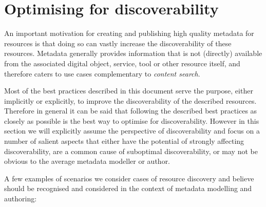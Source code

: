 \section{Optimising for
discoverability}\label{optimising-for-discoverability}


An important motivation for creating and publishing high quality metadata for resources is that doing so can vastly increase the discoverability of these resources. Metadata generally provides information that is not (directly) available from the associated digital object, service, tool or other resource itself, and therefore caters to use cases complementary to \emph{content search}.

Most of the best practices described in this document serve the purpose, either implicitly or explicitly, to improve the discoverability of the described resources. Therefore in general it can be said that following the described best practices as closely as possible is the best way to optimise for discoverability. However in this section we will explicitly assume the perspective of discoverability and focus on a number of salient aspects that either have the potential of strongly affecting discoverability, are a common cause of suboptimal discoverability, or may not be obvious to the average metadata modeller or author.

A few examples of scenarios we consider cases of resource discovery and believe should be recognised and considered in the context of metadata modelling and authoring: 

